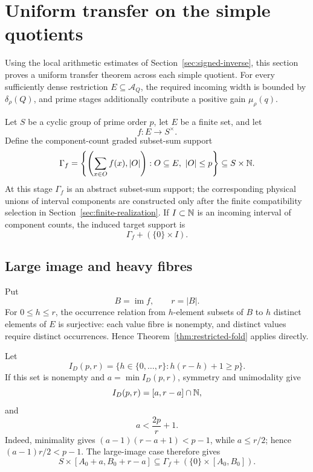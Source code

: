\section{Uniform transfer on the simple quotients}
\label{sec:local-profile}

Using the local arithmetic estimates of Section~\ref{sec:signed-inverse}, this section proves a uniform transfer theorem across each simple quotient.  For every sufficiently dense restriction $E\subseteq\mathcal A_Q$, the required incoming width is bounded by $\delta_\rho(Q)$, and prime stages additionally contribute a positive gain $\mu_\rho(q)$.

Let $S$ be a cyclic group of prime order $p$, let $E$ be a finite set, and let
\[
f:E\longrightarrow S^\times.
\]
Define the component-count graded subset-sum support
\begin{equation}\label{eq:gamma-f}
\Gamma_f=
\left\{
\left(\sum_{x\in O}f(x),|O|\right):
O\subseteq E,\ |O|\le p
\right\}
\subseteq S\times\mathbb N.
\end{equation}
At this stage $\Gamma_f$ is an abstract subset-sum support; the corresponding physical unions of interval components are constructed only after the finite compatibility selection in Section~\ref{sec:finite-realization}.  If $I\subset\mathbb N$ is an incoming interval of component counts, the induced target support is
\[
\Gamma_f+(\{0\}\times I).
\]

\subsection{Large image and heavy fibres}

Put
\[
B=\operatorname{im}f,
\qquad r=|B|.
\]
For $0\le h\le r$, the occurrence relation from $h$-element subsets of $B$ to $h$ distinct elements of $E$ is surjective: each value fibre is nonempty, and distinct values require distinct occurrences.  Hence Theorem~\ref{thm:restricted-fold} applies directly.

Let
\[
I_D(p,r)=\{h\in\{0,\ldots,r\}:h(r-h)+1\ge p\}.
\]
If this set is nonempty and $a=\min I_D(p,r)$, symmetry and unimodality give
\[
I_D(p,r)=[a,r-a]\cap\mathbb N,
\]
and
\begin{equation}\label{eq:rich-demand}
a<\frac{2p}{r}+1.
\end{equation}
Indeed, minimality gives $(a-1)(r-a+1)<p-1$, while $a\le r/2$; hence $(a-1)r/2<p-1$.  The large-image case therefore gives
\begin{equation}\label{eq:rich-rectangle}
S\times[A_0+a,B_0+r-a]
\subseteq
\Gamma_f+(\{0\}\times[A_0,B_0]).
\end{equation}


